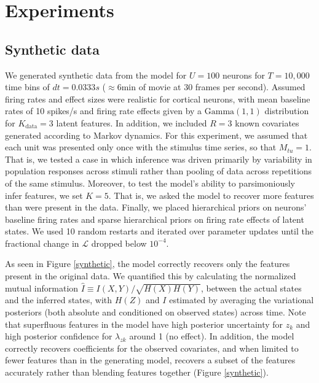 \documentclass[12pt,a4paper]{article}
\begin{document}
\section*{Experiments}
\subsection*{Synthetic data}
We generated synthetic data from the model for $U=100$ neurons for $T=10,000$ time bins of $dt=0.0333s$ ($\approx 6$min of movie at 30 frames per second). Assumed firing rates and effect sizes were realistic for cortical neurons, with mean baseline rates of 10 spikes/s and firing rate effects given by a $\text{Gamma}(1, 1)$ distribution for $K_{\text{data}}=3$ latent features. In addition, we included $R=3$ known covariates generated according to Markov dynamics. For this experiment, we assumed that each unit was presented only once with the stimulus time series, so that $M_{tu} = 1$. That is, we tested a case in which inference was driven primarily by variability in population responses across stimuli rather than pooling of data across repetitions of the same stimulus. Moreover, to test the model's ability to parsimoniously infer features, we set $K=5$. That is, we asked the model to recover more features than were present in the data. Finally, we placed hierarchical priors on neurons' baseline firing rates and sparse hierarchical priors on firing rate effects of latent states. We used 10 random restarts and iterated over parameter updates until the fractional change in $\mathcal{L}$ dropped below $10^{-4}$.

As seen in Figure \ref{synthetic}, the model correctly recovers only the features present in the original data. We quantified this by calculating the normalized mutual information $\hat{I}\equiv I(X, Y)/\sqrt{H(X)H(Y)}$, between the actual states and the inferred states, with $H(Z)$ and $I$ estimated by averaging the variational posteriors (both absolute and conditioned on observed states) across time. Note that superfluous features in the model have high posterior uncertainty for $z_k$ and high posterior confidence for $\lambda_{zk}$ around 1 (no effect). In addition, the model correctly recovers coefficients for the observed covariates, and when limited to fewer features than in the generating model, recovers a subset of the features accurately rather than blending features together (Figure \ref{synthetic}).
\end{document}
